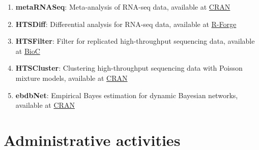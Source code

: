 \documentclass[11pt, a4paper]{awesome-cv}
\begin{document}
\begin{enumerate}
\item
  \textbf{metaRNASeq}: Meta-analysis of RNA-seq data, available at
  \href{https://cran.r-project.org/web/packages/metaRNASeq/index.html}{CRAN}\\
\item
  \textbf{HTSDiff}: Differential analysis for RNA-seq data, available at
  \href{https://r-forge.r-project.org/R/?group_id=1504}{R-Forge}\\
\item
  \textbf{HTSFilter}: Filter for replicated high-throughput sequencing
  data, available at
  \href{http://www.bioconductor.org/packages/release/bioc/html/HTSFilter.html}{BioC}\\
\item
  \textbf{HTSCluster}: Clustering high-throughput sequencing data with
  Poisson mixture models, available at
  \href{http://cran.r-project.org/web/packages/HTSCluster}{CRAN}\\
\item
  \textbf{ebdbNet}: Empirical Bayes estimation for dynamic Bayesian
  networks, available at
  \href{http://cran.r-project.org/web/packages/ebdbNet}{CRAN}
\end{enumerate}

\hypertarget{administrative-activities}{%
\section{Administrative activities}\label{administrative-activities}}
\end{document}
